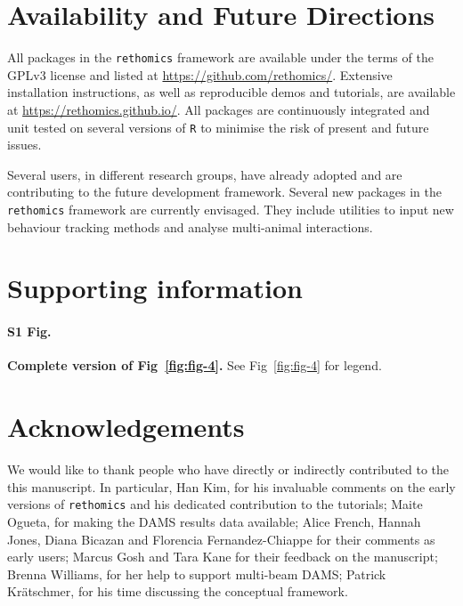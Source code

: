 \documentclass[10pt,letterpaper]{article}\usepackage[]{graphicx}\usepackage[]{color}
\begin{document}
% 

\section*{Availability and Future Directions}
All packages in the \texttt{rethomics} framework are available under the terms of the GPLv3 license and listed at
\href{https://github.com/rethomics}{https://github.com/rethomics/}.
Extensive installation instructions, as well as reproducible demos and tutorials, are available at
\href{https://rethomics.github.io/}{https://rethomics.github.io/}.
All packages are continuously integrated and unit tested on several versions of \texttt{R} to minimise the risk of present and future issues.

Several users, in different research groups, have already adopted and are contributing to the future development framework.
Several new packages in the \texttt{rethomics} framework are currently envisaged. 
They include utilities to input new behaviour tracking methods and analyse multi-animal interactions.

\section*{Supporting information}

\paragraph*{S1 Fig.}
\label{S1-Fig}
{\bf Complete version of Fig~\ref{fig:fig-4}.}
See Fig~\ref{fig:fig-4} for legend.


\section*{Acknowledgements}
We would like to thank people who have directly or indirectly contributed to the this manuscript.
In particular, Han Kim, for his invaluable comments on the early versions of \texttt{rethomics} and his dedicated contribution to the tutorials;
Maite Ogueta, for making the DAMS results data available;
Alice French, Hannah Jones, Diana Bicazan and Florencia Fernandez-Chiappe for their comments as early users;
Marcus Gosh and Tara Kane for their feedback on the manuscript;
Brenna Williams, for her help to support multi-beam DAMS;
Patrick Kr{\"a}tschmer, for his time discussing the conceptual framework.
\end{document}
